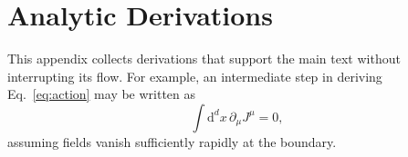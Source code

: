 \section{Analytic Derivations}
\label{app:derivations}

This appendix collects derivations that support the main text without
interrupting its flow. For example, an intermediate step in deriving
Eq.~\eqref{eq:action} may be written as
\begin{equation}
  \int \mathrm{d}^d x\, \partial_\mu J^\mu = 0,
\end{equation}
assuming fields vanish sufficiently rapidly at the boundary.
